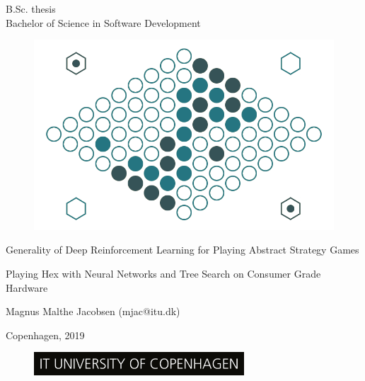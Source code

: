 \thispagestyle{empty} 
\vspace*{1cm}
\sffamily
\begin{flushright}
	B.Sc. thesis\\
	Bachelor of Science in Software Development
\end{flushright}
\vspace{0.9cm}
\begin{figure}[ht]
 	\centering
    \includegraphics[scale=0.45]{graphics/capture4.png}
    \makeatletter
\end{figure}
\vspace{0.9cm}
	\linespread{1.2}\huge{Generality of Deep Reinforcement Learning for Playing Abstract Strategy Games}\par
	\vspace{0.1cm}
	\linespread{1.2}\LARGE{Playing Hex with Neural Networks and Tree Search on Consumer Grade Hardware}\par

\vspace{0.9cm}
\large{Magnus Malthe Jacobsen (mjac@itu.dk)}
\vspace{0.9cm}

\normalsize{Copenhagen, 2019}
\begin{figure}[ht]
    \includegraphics[width=0.7\textwidth]{graphics/ITU_logo_UK.jpg}
    \caption*{}
    \makeatletter
\end{figure}

